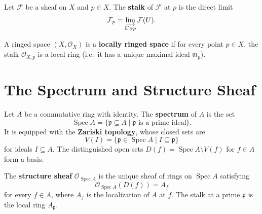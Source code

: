 \documentclass[a4paper]{article}
\begin{document}
\begin{definition}[Stalk]
    \label{def:stalk}
    \leanok
    Let $\mathcal{F}$ be a sheaf on $X$ and $p \in X$. The \textbf{stalk} of $\mathcal{F}$ at $p$ is the direct limit
    \[
        \mathcal{F}_p = \varinjlim_{U \ni p} \mathcal{F}(U).
    \]
\end{definition}

\begin{definition}
    \label{def:locally_ringed_space}
    \leanok
    A ringed space $(X, \mathcal{O}_X)$ is a \textbf{locally ringed space} if for every point $p \in X$, the stalk $\mathcal{O}_{X,p}$ is a local ring (i.e.\ it has a unique maximal ideal $\mathfrak{m}_p$).
\end{definition}

\section{The Spectrum and Structure Sheaf}

\begin{definition}
    \label{def:spectrum}
    \leanok
    Let $A$ be a commutative ring with identity. The \textbf{spectrum} of $A$ is the set
    \[
        \operatorname{Spec} A = \{ \mathfrak{p} \subseteq A \mid \mathfrak{p} \text{ is a prime ideal} \}.
    \]
    It is equipped with the \textbf{Zariski topology}, whose closed sets are
    \[
        V(I) = \{ \mathfrak{p} \in \operatorname{Spec} A \mid I \subseteq \mathfrak{p} \}
    \]
    for ideals $I \subseteq A$. The distinguished open sets $D(f) = \operatorname{Spec} A \setminus V(f)$ for $f \in A$ form a basis.
\end{definition}

\begin{definition}
    \label{def:structure_sheaf}
    \leanok
    The \textbf{structure sheaf} $\mathcal{O}_{\operatorname{Spec} A}$ is the unique sheaf of rings on $\operatorname{Spec} A$ satisfying
    \[
        \mathcal{O}_{\operatorname{Spec} A}(D(f)) = A_f
    \]
    for every $f \in A$, where $A_f$ is the localization of $A$ at $f$. The stalk at a prime $\mathfrak{p}$ is the local ring $A_{\mathfrak{p}}$.
\end{definition}
\end{document}
